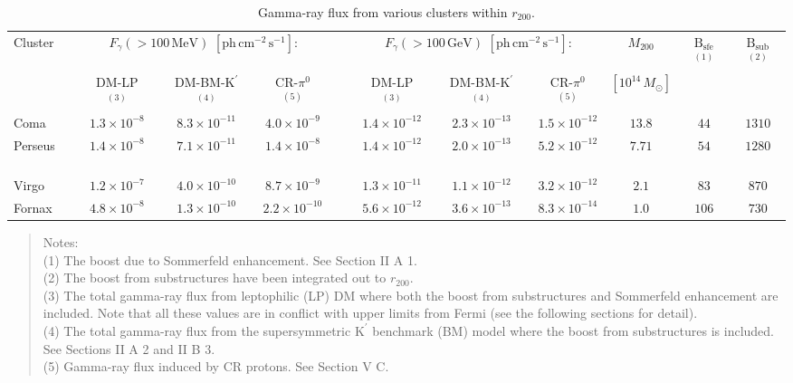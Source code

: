 \documentclass[10pt,aps,pra,reprint,amsmath,amsfonts,amssymb,showpacs,nofootinbib,floatfix]{revtex4-1}
\newcommand{\rmn}{\mathrm}
\newcommand{\msun}{M_\odot}
\newcommand{\Kp}{\rmn{K}^\prime}
\newcommand{\B}{\rmn{B}}
\newcommand{\rvir}{r_{200}}
\newcommand{\mvir}{M_{200}}
\begin{document}
\begin{table}
\begin{minipage}{2.0\columnwidth}
  \caption{Gamma-ray flux from various clusters within $\rvir$.}
\begin{tabular}{l  c c c  c  c c c c c c}
\hline
\hline
 Cluster &
\multicolumn{3}{c}{$F_{\gamma}(>100\,\rmn{MeV})$ $[\rmn{ph}\,\rmn{cm}^{-2}\,\rmn{s}^{-1}]$:} & &
\multicolumn{3}{c}{$F_{\gamma}(>100\,\rmn{GeV})$ $[\rmn{ph}\,\rmn{cm}^{-2}\,\rmn{s}^{-1}]$:} & 
$\mvir$ & $\B_\rmn{sfe} $$^{(1)}$ &  $\B_\rmn{sub} $$^{(2)}$ \\
         & DM-LP $^{(3)}$ & DM-BM-$\Kp$ $^{(4)}$ & CR-$\pi^0$ $^{(5)}$ 
         & & DM-LP $^{(3)}$ & DM-BM-$\Kp$ $^{(4)}$ & CR-$\pi^0$ $^{(5)}$ & $[10^{14}\,\msun]$ &&  \\
 \hline
 Coma                 & $1.3\times10^{-8}$  & $8.3\times10^{-11}$ & $4.0\times10^{-9}$  
 & \,\,\,\,\,         & $1.4\times10^{-12}$ & $2.3\times10^{-13}$ & $1.5\times10^{-12}$ 
 & $13.8$ & $44$  & $1310$ \\
 Perseus \,\,\,\,\,\, & $1.4\times10^{-8}$  & $7.1\times10^{-11}$ & $1.4\times10^{-8}$  
 & \,\,\,\,\,         & $1.4\times10^{-12}$ & $2.0\times10^{-13}$ & $5.2\times10^{-12}$ 
 & $7.71$ & $54$  & $1280$ \\
 Virgo                & $1.2\times10^{-7}$  & $4.0\times10^{-10}$ & $8.7\times10^{-9}$  
 & \,\,\,\,\,         & $1.3\times10^{-11}$ & $1.1\times10^{-12}$ & $3.2\times10^{-12}$ 
 & $2.1$  & $83$  & $870$  \\
 Fornax               & $4.8\times10^{-8}$  & $1.3\times10^{-10}$ & $2.2\times10^{-10}$ 
 & \,\,\,\,\,         & $5.6\times10^{-12}$ & $3.6\times10^{-13}$ & $8.3\times10^{-14}$ 
 & $1.0$  & $106$ & $730$  \\
\hline
\hline
\end{tabular}
\begin{quote}
  Notes: \\
  (1) The boost due to Sommerfeld enhancement. See Section II A 1.\\
  (2) The boost from substructures have been integrated out to $\rvir$.\\
  (3) The total gamma-ray flux from leptophilic (LP) DM where both the
  boost from substructures and Sommerfeld enhancement are
  included. Note that all these values are in conflict with upper limits from
  Fermi (see the following sections for detail).\\
  (4) The total gamma-ray flux from the supersymmetric $\Kp$ benchmark (BM) 
  model where the boost from substructures is included. See Sections II A 2 and II B 3.\\
  (5) Gamma-ray flux induced by CR protons. See Section V C. 
 \label{tab:flux_tab}
  \end{quote}
\end{minipage}
\end{table} 
\end{document}
